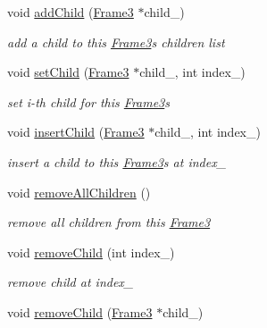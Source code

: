 \begin{DoxyCompactItemize}
\item 
void \hyperlink{class_i_dream_sky_1_1_frame3_ae27f7e1f937aa8e7c753a5fbb29edb6a}{add\+Child} (\hyperlink{class_i_dream_sky_1_1_frame3}{Frame3} $\ast$child\+\_\+)
\begin{DoxyCompactList}\small\item\em add a child to this \hyperlink{class_i_dream_sky_1_1_frame3}{Frame3}\textquotesingle{}s children list \end{DoxyCompactList}\item 
void \hyperlink{class_i_dream_sky_1_1_frame3_a64ca03a7b807989e1cbd50f66060df4d}{set\+Child} (\hyperlink{class_i_dream_sky_1_1_frame3}{Frame3} $\ast$child\+\_\+, int index\+\_\+)
\begin{DoxyCompactList}\small\item\em set i-\/th child for this \hyperlink{class_i_dream_sky_1_1_frame3}{Frame3}\textquotesingle{}s \end{DoxyCompactList}\item 
void \hyperlink{class_i_dream_sky_1_1_frame3_abd28ece5e1c768a39c5786b233577a51}{insert\+Child} (\hyperlink{class_i_dream_sky_1_1_frame3}{Frame3} $\ast$child\+\_\+, int index\+\_\+)
\begin{DoxyCompactList}\small\item\em insert a child to this \hyperlink{class_i_dream_sky_1_1_frame3}{Frame3}\textquotesingle{}s at index\+\_\+ \end{DoxyCompactList}\item 
void \hyperlink{class_i_dream_sky_1_1_frame3_ac0b78ba19552fe28163db05161795a37}{remove\+All\+Children} ()\hypertarget{class_i_dream_sky_1_1_frame3_ac0b78ba19552fe28163db05161795a37}{}\label{class_i_dream_sky_1_1_frame3_ac0b78ba19552fe28163db05161795a37}

\begin{DoxyCompactList}\small\item\em remove all children from this \hyperlink{class_i_dream_sky_1_1_frame3}{Frame3} \end{DoxyCompactList}\item 
void \hyperlink{class_i_dream_sky_1_1_frame3_a9bba1efc2cdadd1d11c1fdd3ac6e43bd}{remove\+Child} (int index\+\_\+)\hypertarget{class_i_dream_sky_1_1_frame3_a9bba1efc2cdadd1d11c1fdd3ac6e43bd}{}\label{class_i_dream_sky_1_1_frame3_a9bba1efc2cdadd1d11c1fdd3ac6e43bd}

\begin{DoxyCompactList}\small\item\em remove child at index\+\_\+ \end{DoxyCompactList}\item 
void \hyperlink{class_i_dream_sky_1_1_frame3_a7f5e45ec9722716b94932e3b9ba1b019}{remove\+Child} (\hyperlink{class_i_dream_sky_1_1_frame3}{Frame3} $\ast$child\+\_\+)\hypertarget{class_i_dream_sky_1_1_frame3_a7f5e45ec9722716b94932e3b9ba1b019}{}\label{class_i_dream_sky_1_1_frame3_a7f5e45ec9722716b94932e3b9ba1b019}


\end{DoxyCompactItemize}
